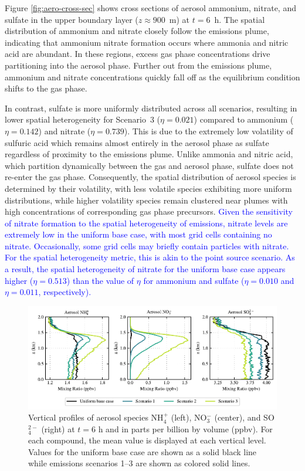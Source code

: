 \documentclass[journal abbreviation, manuscript]{copernicus}
\begin{document}
Figure \ref{fig:aero-cross-sec} shows cross sections of aerosol
ammonium, nitrate, and sulfate in the upper boundary layer
($z\approx900$~m) at $t=6$~h. The spatial distribution of ammonium and
nitrate closely follow the emissions plume, indicating that ammonium
nitrate formation occurs where ammonia and nitric acid are
abundant. In these regions, excess gas phase concentrations drive
partitioning into the aerosol phase. Further out from the emissions
plume, ammonium and nitrate concentrations quickly fall off as the
equilibrium condition shifts to the gas phase.

In contrast, sulfate is more uniformly distributed across all
scenarios, resulting in lower spatial heterogeneity for Scenario~3
($\eta=0.021$) compared to ammonium ($\eta = 0.142$) and nitrate
($\eta=0.739$).  This is due to the extremely low volatility of
sulfuric acid which remains almost entirely in the aerosol phase as
sulfate regardless of proximity to the emissions plume. Unlike ammonia
and nitric acid, which partition dynamically between the gas and
aerosol phase, sulfate does not re-enter the gas phase. Consequently,
the spatial distribution of aerosol species is determined by their
volatility, with less volatile species exhibiting more uniform
distributions, while higher volatility species remain clustered near
plumes with high concentrations of corresponding gas phase precursors.
\textcolor{blue}{Given the
  sensitivity of nitrate formation to the spatial heterogeneity of
  emissions, nitrate levels are extremely low in the uniform base
  case, with most grid cells containing no nitrate. Occasionally, some
  grid cells may briefly contain particles with nitrate. For the
  spatial heterogeneity metric, this is akin to the point source
  scenario. As a result, the spatial heterogeneity of nitrate for the
  uniform base case appears higher ($\eta=0.513$) than the value of
  $\eta$ for ammonium and sulfate ($\eta=0.010$ and $\eta=0.011$,
  respectively).}

\begin{figure}[!h]
	\centering
	\includegraphics[]{figures/aerosol-SNA-vertical-profiles-time36.pdf}
	\caption{Vertical profiles of aerosol species NH$_4^+$ (left),
          NO$_3^-$ (center), and SO$_4^{2-}$ (right) at $t=6$ h and in
          parts per billion by volume (ppbv). For each compound, the
          mean value is displayed at each vertical level. Values for
          the uniform base case are shown as a solid black line while
          emissions scenarios 1--3 are shown as colored solid lines.}
	\label{fig:vertical-profile-SNA}
\end{figure} 
\end{document}
